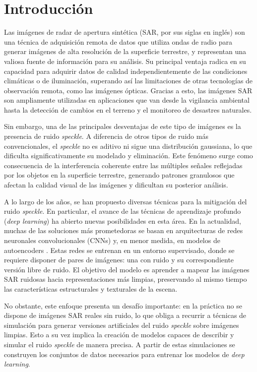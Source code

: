 \chapter{Introducción}

Las imágenes de radar de apertura sintética (SAR, por sus siglas en inglés) son una técnica de adquisición remota de datos que utiliza ondas de radio para generar imágenes de alta resolución de la superficie terrestre, y representan una valiosa fuente de información para su análisis. Su principal ventaja radica en su capacidad para adquirir datos de calidad independientemente de las condiciones climáticas o de iluminación, superando así las limitaciones de otras tecnologías de observación remota, como las imágenes ópticas. Gracias a esto, las imágenes SAR son ampliamente utilizadas en aplicaciones que van desde la vigilancia ambiental hasta la detección de cambios en el terreno y el monitoreo de desastres naturales.

Sin embargo, una de las principales desventajas de este tipo de imágenes es la presencia de ruido \emph{speckle}. A diferencia de otros tipos de ruido más convencionales, el \emph{speckle} no es aditivo ni sigue una distribución gaussiana, lo que dificulta significativamente su modelado y eliminación. Este fenómeno surge como consecuencia de la interferencia coherente entre las múltiples señales reflejadas por los objetos en la superficie terrestre, generando patrones granulosos que afectan la calidad visual de las imágenes y dificultan su posterior análisis.

A lo largo de los años, se han propuesto diversas técnicas para la mitigación del ruido \emph{speckle}. En particular, el avance de las técnicas de aprendizaje profundo (\textit{deep learning}) ha abierto nuevas posibilidades en esta área. En la actualidad, muchas de las soluciones más prometedoras se basan en arquitecturas de redes neuronales convolucionales (CNNs) \cite{wang2017sar} y, en menor medida, en modelos de autoencoders \cite{lattari2019deep}. Estas redes se entrenan en un entorno supervisado, donde se requiere disponer de pares de imágenes: una con ruido y su correspondiente versión libre de ruido. El objetivo del modelo es aprender a mapear las imágenes SAR ruidosas hacia representaciones más limpias, preservando al mismo tiempo las características estructurales y texturales de la escena.

No obstante, este enfoque presenta un desafío importante: en la práctica no se dispone de imágenes SAR reales sin ruido, lo que obliga a recurrir a técnicas de simulación para generar versiones artificiales del ruido \emph{speckle} sobre imágenes limpias. Esto a su vez implica la creación de modelos capaces de describir y simular el ruido \emph{speckle} de manera precisa. A partir de estas simulaciones se construyen los conjuntos de datos necesarios para entrenar los modelos de \emph{deep learning}.

